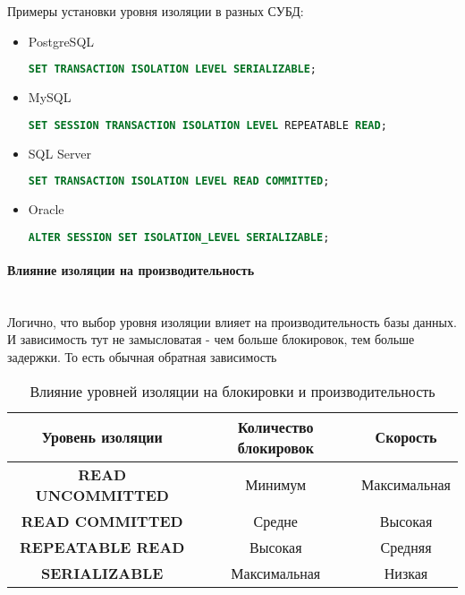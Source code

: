  Примеры установки уровня изоляции в разных СУБД:
 \begin{itemize}
     \item PostgreSQL
     \begin{lstlisting}[language=SQL]
         SET TRANSACTION ISOLATION LEVEL SERIALIZABLE;
     \end{lstlisting}
 
     \item MySQL
     \begin{lstlisting}[language=SQL]
         SET SESSION TRANSACTION ISOLATION LEVEL REPEATABLE READ;
     \end{lstlisting}
 
     \item SQL Server
     \begin{lstlisting}[language=SQL]
         SET TRANSACTION ISOLATION LEVEL READ COMMITTED;
     \end{lstlisting}
 
     \item Oracle
     \begin{lstlisting}[language=SQL]
         ALTER SESSION SET ISOLATION_LEVEL SERIALIZABLE;
     \end{lstlisting}
 
 \end{itemize}
 
 \paragraph{Влияние изоляции на производительность} ~\\
 
 Логично, что выбор уровня изоляции влияет на производительность базы данных. И зависимость тут не замысловатая - чем больше блокировок, тем больше задержки. То есть обычная обратная зависимость
 
 \begin{table}[H]
     \centering
     \begin{tabular}{|c|c|c|}
         \hline
         \textbf{Уровень изоляции} & \textbf{Количество блокировок} & \textbf{Скорость} \\
         \hline
         \textbf{READ UNCOMMITTED} & Минимум & Максимальная \\
         \hline
         \textbf{READ COMMITTED} & Средне & Высокая \\
         \hline
         \textbf{REPEATABLE READ} & Высокая & Средняя \\
         \hline
         \textbf{SERIALIZABLE} & Максимальная & Низкая \\
         \hline
     \end{tabular}
     \caption{Влияние уровней изоляции на блокировки и производительность}
     \label{tab:isolation_performance}
 \end{table}
 
